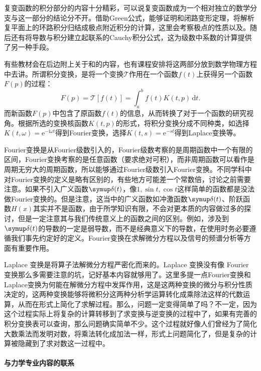 复变函数的积分部分的内容十分精彩，可以说复变函数成为一个相对独立的数学分支与这一部分的结论分不开。借助Green公式，能够证明和闭路变形定理，将解析复平面上的环路积分归结成极点附近积分的计算，这里会考察极点的性质以及。随后还有将导数与积分建立起联系的Cauchy积分公式，这为级数中系数的计算提供了另一种手段。

有些教材会在后边附上关于和的内容，也有课程安排将这两部分放到数学物理方程中去讲。所谓积分变换，是将一个变换$\mathscr{T}$作用在一个函数$f(t)$上获得另一个函数$F(p)$的过程：
\[
    F\left( p \right) =\mathscr{T}\left[ f\left( t \right) \right] =\int_a^b{f\left( t \right) K\left( t,p \right) \,\mathrm{d}t}
    .\]
而新函数$F(p)$中包含了原函数$f(t)$的信息，从而转换了对于一个函数的研究视角。根据所选的变换核函数$K(t,p)$的形式，将积分变换分成不同种类，如选择$K(t,\omega)=\mathrm{e}^{-\mathrm{i}\omega t}$得到Fourier变换，选择$K(t,s)=\mathrm{e}^{-st}$得到Laplace变换等。


Fourier变换是从Fourier级数引入的，Fourier级数考察的是周期函数中一个有限的区间，Fourier变换考察的是任意函数（要求绝对可积），而非周期函数可以看作是周期无穷大的周期函数，所以能够通过Fourier级数引入Fourier变换。不同学科中对Fourier变换的定义是略有区别的，有些地方可能差一个常数倍，讨论之前需要注意。如果不引入广义函数$\symup\delta(t)$，像$1,\sin t,\cos t$这样简单的函数都是没法做Fourier变换的。但是注意，这当中的广义函数如冲激函数$\symup\delta(t)$、阶跃函数$H(x)$其实并不是函数，由于所学知识有限，不会对更本质的内容做过多的探讨，但是一定注意其与我们传统意义上的函数之间的区别。例如，涉及到$\symup\delta(t)$的导数的一定是弱导数，而不是经典意义下的导数，在使用时务必要遵循我们事先约定好的定义。Fourier变换在求解微分方程以及信号的频谱分析等方面有重要作用。

Laplace 变换是将算子法解微分方程严密化而来的。Laplace 变换没有像 Fourier 变换那么多需要注意的坑，记好基本内容就够用了。这里多提一点Fourier变换和Laplace变换为何能在解微分方程中发挥作用，这是这两种变换的微分与积分性质决定的，这两种变换能够将微积分这两种分析学运算转化成乘除法这样的代数运算，从而在形式上简化了求解过程。那么，问题一定变得简单了吗？不一定，因为这个过程实际上将复杂的计算转移到了求变换与逆变换的过程中了，如果有完善的积分变换表可以查询，那么问题确实简单不少。这个过程就好像人们曾经为了简化大数乘法而发明对数，将乘法转化成加法一样，形式上问题简化了，但是复杂的计算被隐藏到了求对数这一过程中。

\paragraph{与力学专业内容的联系}

